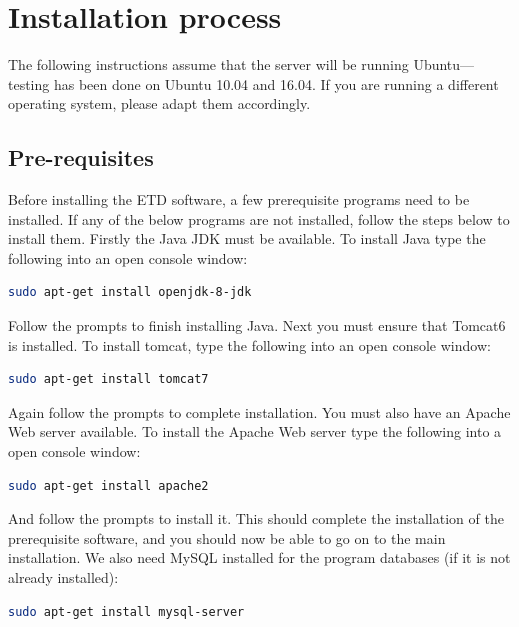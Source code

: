 \documentclass[a4paper,11pt]{article}
\begin{document}
\section{Installation process}
\label{sec:installation_process}

The following instructions assume that the server will be running Ubuntu---testing has been done on Ubuntu 10.04 and 16.04. If you are running a different operating system, please adapt them accordingly.

\subsection{Pre-requisites}
\label{sec:installation_process:prerequisites}

Before installing the ETD software, a few prerequisite programs need to be installed. If any of the below programs are not installed, follow the steps below to install them. Firstly the Java JDK must be available. To install Java type the following into an open console window: 

\begin{lstlisting}[language=bash]
sudo apt-get install openjdk-8-jdk
\end{lstlisting}


Follow the prompts to finish installing Java. Next you must ensure that Tomcat6 is installed. To install tomcat, type the following into an open console window: 

\begin{lstlisting}[language=bash]
sudo apt-get install tomcat7
\end{lstlisting}


Again follow the prompts to complete installation. You must also have an Apache Web server available. To install the Apache Web server type the following into a open console window: 

\begin{lstlisting}[language=bash]
sudo apt-get install apache2
\end{lstlisting}

And follow the prompts to install it. This should complete the installation of the prerequisite software, and you should now be able to go on to the main installation. We also need MySQL installed for the program databases (if it is not already installed): 

\begin{lstlisting}[language=bash]
sudo apt-get install mysql-server
\end{lstlisting}
\end{document}
